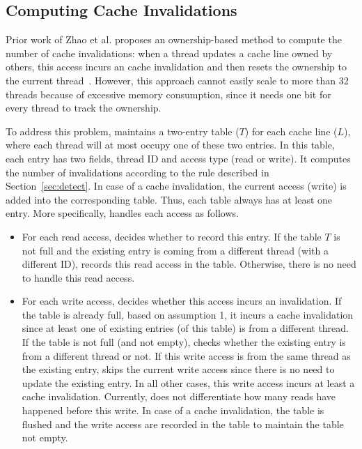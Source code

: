\subsection{Computing Cache Invalidations}
\label{sec:computeinvalidations}

Prior work of Zhao et al. proposes an ownership-based method to compute the number of cache invalidations: when a thread updates a cache line owned by others, this access incurs an cache invalidation and then resets the ownership to the current thread~\cite{qinzhao}. However, this approach cannot easily scale to more than 32 threads because of excessive memory consumption, since it needs one bit for every thread to track the ownership.  

To address this problem, \Cheetah{} maintains a two-entry table ($T$) for each cache line ($L$), where each thread will at most occupy one of these two entries. In this table, each entry has two fields, thread ID and access type (read or write). It computes the number of invalidations according to the rule described in Section~\ref{sec:detect}. In case of a cache invalidation, the current access (write) is added into the corresponding table. Thus, each table always has at least one entry. More specifically, \cheetah{} handles each access as follows.

\begin{itemize}
\item
For each read access, \cheetah{} decides whether to record this entry. If the table $T$ is not full and the existing entry is coming from a different thread (with a different ID), \cheetah{} records this read access in the table. Otherwise, there is no need to handle this read access. 
  
\item
For each write access, \cheetah{} decides whether this access incurs an invalidation. If the table is already full, based on assumption 1, it incurs a cache invalidation since at least one of existing entries (of this table) is from a different thread. If the table is not full (and not empty), \cheetah{} checks whether the existing entry is from a different thread or not. If this write access is from the same thread as the existing entry, \cheetah{} skips the current write access since there is no need to update the existing entry. In all other cases, this write access incurs at least a cache invalidation. Currently, \cheetah{} does not differentiate how many reads have happened before this write. In case of a cache invalidation, the table is flushed and the write access are recorded in the table to maintain the table not empty. 
  
\end{itemize}
     

